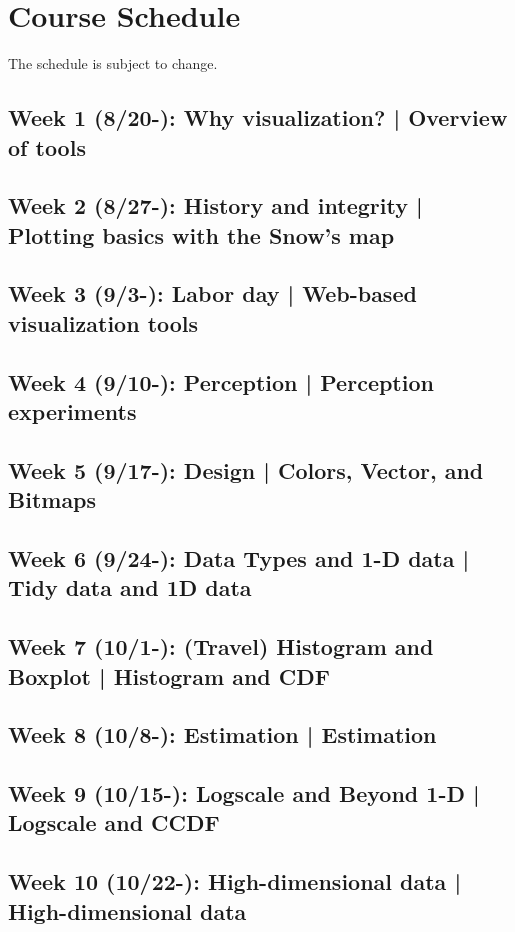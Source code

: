 \documentclass[11pt,article,oneside]{memoir} %
\begin{document}
\section{Course Schedule}%

The schedule is subject to change. 


\subsection{Week 1 (8/20-): Why visualization? | Overview of tools }
\subsection{Week 2 (8/27-): History and integrity | Plotting basics with the Snow's map }
\subsection{Week 3 (9/3-): Labor day | Web-based visualization tools}
\subsection{Week 4 (9/10-): Perception | Perception experiments }
\subsection{Week 5 (9/17-): Design | Colors, Vector, and Bitmaps }
\subsection{Week 6 (9/24-): Data Types and 1-D data | Tidy data and 1D data } 
\subsection{Week 7 (10/1-): (Travel) Histogram and Boxplot | Histogram and CDF }
\subsection{Week 8 (10/8-): Estimation | Estimation }
\subsection{Week 9 (10/15-): Logscale and Beyond 1-D | Logscale and CCDF}
\subsection{Week 10 (10/22-): High-dimensional data | High-dimensional data }
\end{document}
